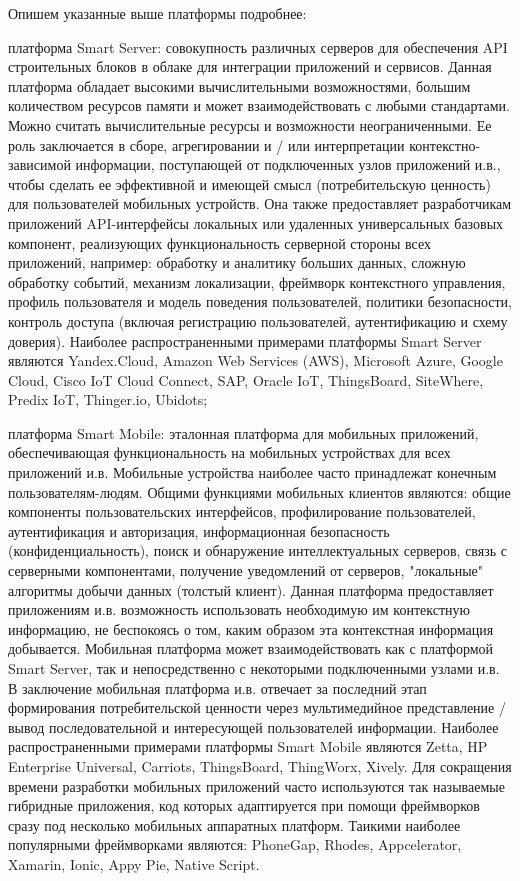 Опишем указанные выше платформы подробнее:
\begin{textitemize}
	\item платформа Smart Server: совокупность различных серверов для обеспечения API строительных блоков в облаке для интеграции приложений и сервисов. Данная платформа обладает высокими вычислительными возможностями, большим количеством ресурсов памяти и может взаимодействовать с любыми стандартами. Можно считать вычислительные ресурсы и возможности неограниченными. Ее роль заключается в сборе, агрегировании и / или интерпретации контекстно-зависимой информации, поступающей от подключенных узлов приложений и.в., чтобы сделать ее эффективной и имеющей смысл (потребительскую ценность) для пользователей мобильных устройств. Она также предоставляет разработчикам приложений API-интерфейсы локальных или удаленных универсальных базовых компонент, реализующих функциональность серверной стороны всех приложений, например: обработку и аналитику больших данных, сложную обработку событий, механизм локализации, фреймворк контекстного управления, профиль пользователя и модель поведения пользователей, политики безопасности, контроль доступа (включая регистрацию пользователей, аутентификацию и схему доверия). Наиболее распространенными примерами платформы Smart Server являются Yandex.Cloud, Amazon Web Services (AWS), Microsoft Azure, Google Cloud, Cisco IoT Cloud Connect, SAP, Oracle IoT, ThingsBoard, SiteWhere, Predix IoT, Thinger.io, Ubidots;
	\item платформа Smart Mobile: эталонная платформа для мобильных приложений, обеспечивающая функциональность на мобильных устройствах для всех приложений и.в. Мобильные устройства наиболее часто принадлежат конечным пользователям-людям. Общими функциями мобильных клиентов являются: общие компоненты пользовательских интерфейсов, профилирование пользователей, аутентификация и авторизация, информационная безопасность (конфиденциальность), поиск и обнаружение интеллектуальных серверов, связь с серверными компонентами, получение уведомлений от серверов, "локальные"{} алгоритмы добычи данных (толстый клиент). Данная платформа предоставляет приложениям и.в. возможность использовать необходимую им контекстную информацию, не беспокоясь о том, каким образом эта контекстная информация добывается. Мобильная платформа может взаимодействовать как с платформой Smart Server, так и непосредственно с некоторыми подключенными узлами и.в. В заключение мобильная платформа и.в. отвечает за последний этап формирования потребительской ценности через мультимедийное представление / вывод последовательной и интересующей пользователей информации. Наиболее распространенными примерами платформы Smart Mobile являются Zetta, HP Enterprise Universal, Carriots, ThingsBoard, ThingWorx, Xively. Для сокращения времени разработки мобильных приложений часто используются так называемые гибридные приложения, код которых адаптируется при помощи фреймворков сразу под несколько мобильных аппаратных платформ. Таикими наиболее популярными фреймворками являются: PhoneGap, Rhodes, Appcelerator, Xamarin, Ionic, Appy Pie, Native Script.

\end{textitemize}

